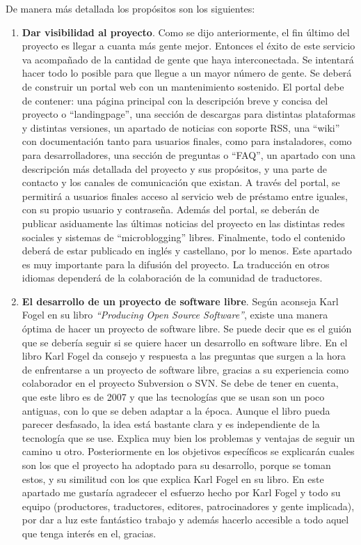 \documentclass[a4paper, 12pt]{book}
\begin{document}

De manera más detallada los propósitos son los siguientes:

\begin{enumerate}{}
\item\textbf{Dar visibilidad al proyecto}. Como se dijo anteriormente, el fin 
último del proyecto es llegar a cuanta más gente mejor. Entonces el éxito de 
este servicio va acompañado de la cantidad de gente que haya interconectada. Se 
intentará hacer todo lo posible para que llegue a un mayor número de gente. Se 
deberá de construir un portal web con un mantenimiento sostenido. El portal debe 
de contener: una página principal con la descripción breve y concisa del 
proyecto o ``landingpage'', una sección de descargas para distintas plataformas 
y distintas versiones, un apartado de noticias con soporte RSS, una ``wiki'' 
con documentación tanto para usuarios finales, como para instaladores, como 
para desarrolladores, una sección de preguntas o ``FAQ'', un apartado con una 
descripción más detallada del proyecto y sus propósitos, y una parte de 
contacto y los canales de comunicación que existan. A través del portal, se 
permitirá a usuarios finales acceso al servicio web de préstamo entre iguales, 
con su propio usuario y contraseña. Además del portal, se deberán de publicar 
asiduamente las últimas noticias del proyecto en las distintas redes sociales 
y sistemas de ``microblogging'' libres. Finalmente, todo el contenido deberá de 
estar publicado en inglés y castellano, por lo menos. Este apartado es muy 
importante para la difusión del proyecto. La traducción en otros idiomas 
dependerá de la colaboración de la comunidad de traductores.

\item\textbf{El desarrollo de un proyecto de software libre}. Según aconseja 
Karl Fogel en su libro \textit{``Producing Open Source Software''}, existe una 
manera óptima de hacer un proyecto de software libre. Se puede decir que es el 
guión que se debería seguir si se quiere hacer un desarrollo en software libre. 
En el libro Karl Fogel da consejo y respuesta a las preguntas que surgen a la 
hora de enfrentarse a un proyecto de software libre, gracias a su experiencia 
como colaborador en el proyecto Subversion o SVN. Se debe de tener en cuenta, 
que este libro es de 2007 y que las tecnologías que se usan son un poco 
antiguas, con lo que se deben adaptar a la época. Aunque el libro pueda 
parecer desfasado, la idea está bastante clara y es independiente de la 
tecnología que se use. Explica muy bien los problemas y ventajas de seguir un 
camino u otro. Posteriormente en los objetivos específicos se explicarán cuales 
son los que el proyecto ha adoptado para su desarrollo, porque se toman estos, 
y su similitud con los que explica Karl Fogel en su libro. En este apartado me 
gustaría agradecer el esfuerzo hecho por Karl Fogel y todo su equipo 
(productores, traductores, editores, patrocinadores y gente implicada), por dar 
a luz este fantástico trabajo y además hacerlo accesible a todo aquel que tenga 
interés en el, gracias.
\end{enumerate}
\end{document}
